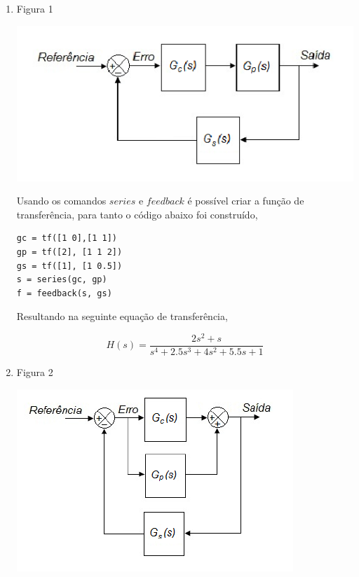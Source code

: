 \documentclass[a4paper, 10pt]{article}
\begin{document}
\begin{list}{\textbf{Questão .}}{
\setlength{\labelwidth}{-2mm} \setlength{\parsep}{0mm}
\setlength{\topsep}{0mm} \setlength{\leftmargin}{0mm}}
    \begin{enumerate}
        \item
            Figura 1
            \begin{center}
            \includegraphics[scale=0.5]{fig5a.png}
            \end{center}

            Usando os comandos $series$ e $feedback$ é possível criar a função
            de transferência, para tanto o código abaixo foi construído,

            \begin{lstlisting}
gc = tf([1 0],[1 1])
gp = tf([2], [1 1 2])
gs = tf([1], [1 0.5])
s = series(gc, gp)
f = feedback(s, gs)
             \end{lstlisting}

            Resultando na seguinte equação de transferência,

            $$
            H(s) = \frac{2 s^2 + s}{s^4 + 2.5 s^3 + 4 s^2 + 5.5 s + 1}
            $$


        \item
             Figura 2
            \begin{center}
            \includegraphics[scale=0.5]{fig5b.png}
            \end{center}
            

\end{enumerate}
\end{list}
\end{document}
